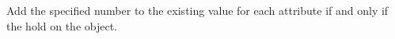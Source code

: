 Add the specified number to the existing value for each attribute if and only if
the  hold on the object.




